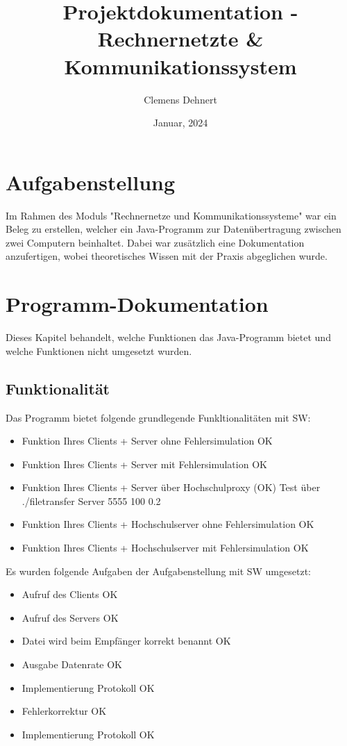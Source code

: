 \documentclass{article}
\title{Projektdokumentation - Rechnernetzte \& Kommunikationssystem}
\author{Clemens Dehnert}
\date{Januar, 2024}
\begin{document}
\maketitle
\newpage

\tableofcontents
\newpage

\section{Aufgabenstellung}
Im Rahmen des Moduls "Rechnernetze und Kommunikationssysteme" war ein Beleg zu erstellen, welcher ein Java-Programm zur Datenübertragung zwischen zwei Computern beinhaltet. Dabei war zusätzlich eine Dokumentation anzufertigen, wobei theoretisches Wissen mit der Praxis abgeglichen wurde.

\section{Programm-Dokumentation}
Dieses Kapitel behandelt, welche Funktionen das Java-Programm bietet und welche Funktionen nicht umgesetzt wurden.

\subsection{Funktionalität}
Das Programm bietet folgende grundlegende Funkltionalitäten mit SW:
\begin{itemize}
  \item Funktion Ihres Clients + Server ohne Fehlersimulation OK 
  \item Funktion Ihres Clients + Server mit Fehlersimulation OK
  \item Funktion Ihres Clients + Server über Hochschulproxy (OK) Test über ./filetransfer Server 5555 100 0.2
  \item Funktion Ihres Clients + Hochschulserver ohne Fehlersimulation OK
  \item Funktion Ihres Clients + Hochschulserver mit Fehlersimulation OK
\end{itemize}

\vspace{1em}Es wurden folgende Aufgaben der Aufgabenstellung mit SW umgesetzt:
\begin{itemize}
  \item Aufruf des Clients OK 
  \item Aufruf des Servers OK
  \item Datei wird beim Empfänger korrekt benannt OK
  \item Ausgabe Datenrate OK
  \item Implementierung Protokoll OK
  \item Fehlerkorrektur OK
  \item Implementierung Protokoll OK
\end{itemize}
\end{document}

